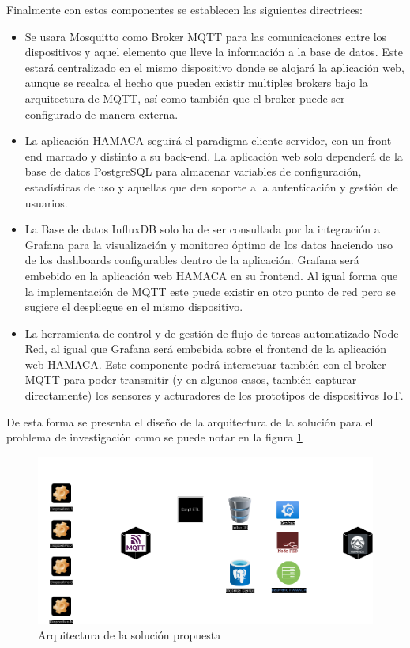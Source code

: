 Finalmente con estos componentes se establecen las siguientes directrices:
\begin{itemize}

\item Se usara Mosquitto como Broker MQTT para las comunicaciones entre los dispositivos y aquel elemento que lleve la información a la base de datos. Este estará centralizado en el mismo dispositivo donde se alojará la aplicación web, aunque se recalca el hecho que pueden existir multiples brokers bajo la arquitectura de MQTT, así como también que el broker puede ser configurado de manera externa.


\item La aplicación HAMACA seguirá el paradigma cliente-servidor, con un front-end marcado y distinto a su back-end. La aplicación web solo dependerá de la base de datos PostgreSQL para almacenar variables de configuración, estadísticas de uso y aquellas que den soporte a la autenticación y gestión de usuarios.


\item La Base de datos InfluxDB solo ha de ser consultada por la integración a Grafana para la visualización y monitoreo óptimo de los datos haciendo uso de los dashboards configurables dentro de la aplicación. Grafana será embebido en la aplicación web HAMACA en su frontend. Al igual forma que la implementación de MQTT este puede existir en otro punto de red pero se sugiere el despliegue en el mismo dispositivo. 

\item La herramienta de control y de gestión de flujo de tareas automatizado Node-Red, al igual que Grafana será embebida sobre el frontend de la aplicación web HAMACA. Este componente podrá interactuar también con el broker MQTT para poder transmitir (y en algunos casos, también capturar directamente) los sensores y acturadores de los prototipos de dispositivos IoT.

\end{itemize}
De esta forma se presenta el diseño de la arquitectura de la solución para el problema de investigación como se puede notar en la figura \ref{fig:arquitectura_hamaca}
\begin{figure}[!htb]
\centering
\includegraphics[scale=0.28]{./Figuras/arquitectura_hamaca.png}
\caption{Arquitectura de la solución propuesta}
\label{fig:arquitectura_hamaca}
\vspace*{-10pt}
\end{figure}

